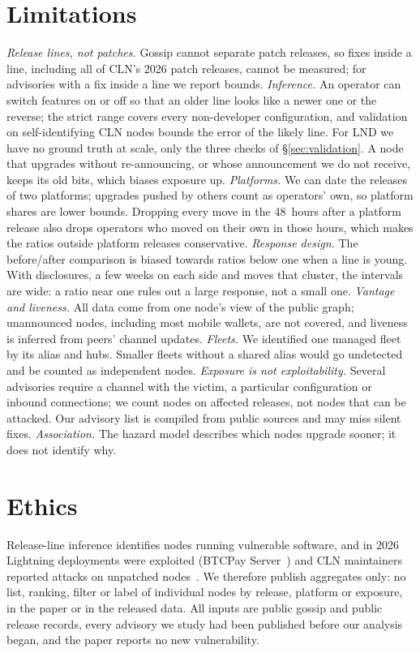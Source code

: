 \section{Limitations}
\label{sec:limitations}
\emph{Release lines, not patches.} Gossip cannot separate patch releases, so fixes inside a line, including all
of CLN's 2026 patch releases, cannot be measured; for advisories with a fix inside a line we report bounds.
\emph{Inference.} An operator can switch features on or off so that an older line looks like a newer one or the
reverse; the strict range covers every non-developer configuration, and validation on self-identifying CLN nodes
bounds the error of the likely line. For LND we have no ground truth at scale, only the three checks of
\S\ref{sec:validation}. A node that upgrades without re-announcing, or whose announcement we do not receive, keeps its
old bits, which biases exposure up.
\emph{Platforms.} We can date the releases of two platforms; upgrades pushed by others count as operators' own, so
platform shares are lower bounds. Dropping every move in the 48~hours after a platform release also drops operators
who moved on their own in those hours, which makes the ratios outside platform releases conservative.
\emph{Response design.} The before/after comparison is biased towards ratios below one when a line is young. With
\NResp{} disclosures, a few weeks on each side and moves that cluster, the intervals are wide: a ratio near one rules
out a large response, not a small one.
\emph{Vantage and liveness.} All data come from one node's view of the public graph; unannounced nodes, including
most mobile wallets, are not covered, and liveness is inferred from peers' channel updates.
\emph{Fleets.} We identified one managed fleet by its alias and hubs. Smaller fleets without a shared alias would go
undetected and be counted as independent nodes.
\emph{Exposure is not exploitability.} Several advisories require a channel with the victim, a particular
configuration or inbound connections; we count nodes on affected releases, not nodes that can be attacked. Our
advisory list is compiled from public sources and may miss silent fixes.
\emph{Association.} The hazard model describes which nodes upgrade sooner; it does not identify why.

\section{Ethics}
\label{sec:ethics}
Release-line inference identifies nodes running vulnerable software, and in 2026 Lightning deployments were
exploited (BTCPay Server~\cite{btcpay2026advisory}) and CLN maintainers reported attacks on unpatched
nodes~\cite{coreln2026attacks}. We therefore publish aggregates only: no list, ranking, filter or label of individual
nodes by release, platform or exposure, in the paper or in the released data. All inputs are public gossip and public
release records, every advisory we study had been published before our analysis began, and the paper reports no new
vulnerability.

